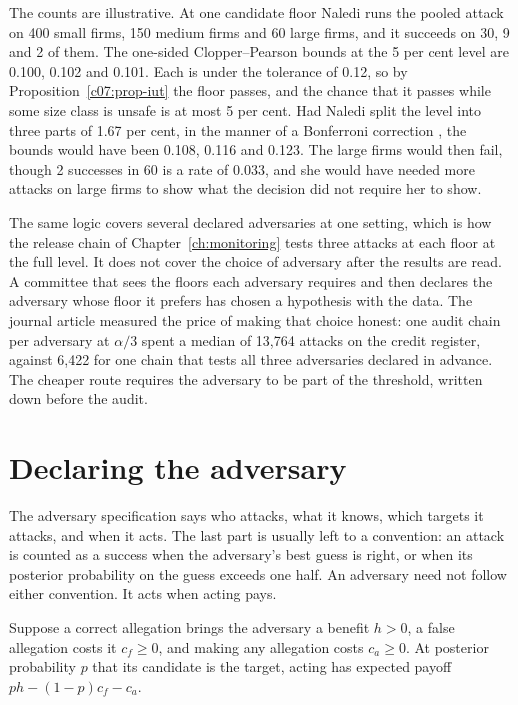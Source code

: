 \begin{example}\label{c07:ex-sizes}
The counts are illustrative. At one candidate floor Naledi runs the pooled attack on 400
small firms, 150 medium firms and 60 large firms, and it succeeds on 30, 9 and 2 of them.
The one-sided Clopper--Pearson bounds at the 5 per cent level are 0.100, 0.102 and 0.101.
Each is under the tolerance of 0.12, so by Proposition~\ref{c07:prop-iut} the floor
passes, and the chance that it passes while some size class is unsafe is at most 5 per
cent. Had Naledi split the level into three parts of 1.67 per cent, in the manner of a
Bonferroni correction \citep{dunn1961}, the bounds would have been 0.108, 0.116 and 0.123.
The large firms would then fail, though 2 successes in 60 is a rate of 0.033, and she
would have needed more attacks on large firms to show what the decision did not require
her to show.
\end{example}

The same logic covers several declared adversaries at one setting, which is how the
release chain of Chapter~\ref{ch:monitoring} tests three attacks at each floor at
the full level. It does not cover the choice of adversary after the results are
read. A committee that sees the floors each adversary requires and then declares
the adversary whose floor it prefers has chosen a hypothesis with the data. The
journal article measured the price of making that choice honest: one audit chain per
adversary at $\alpha/3$ spent a median of 13,764 attacks on the credit register,
against 6,422 for one chain that tests all three adversaries declared in advance.
The cheaper route requires the adversary to be part of the threshold, written down
before the audit.

\section{Declaring the adversary}\label{c07:sec-adversary}

The adversary specification says who attacks, what it knows, which targets it
attacks, and when it acts. The last part is usually left to a convention: an
attack is counted as a success when the adversary's best guess is right, or when
its posterior probability on the guess exceeds one half. An adversary need not
follow either convention. It acts when acting pays.

Suppose a correct allegation brings the adversary a benefit $h > 0$, a false
allegation costs it $c_f \ge 0$, and making any allegation costs $c_a \ge 0$. At
posterior probability $p$ that its candidate is the target, acting has expected
payoff $ph - (1-p)c_f - c_a$.

